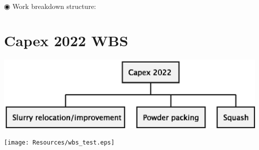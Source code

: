 \documentclass[11pt]{article}
\author{Ricardo Antunes}
\date{\today}
\title{}
\begin{document}
\tableofcontents

◉ Work breakdown structure:
\section{Capex 2022 WBS}
\label{sec:orgb166588}


\label{fig_wbs}
\begin{center}
\includegraphics[width=.9\linewidth]{Resources/wbs.eps}
\end{center}


\begin{center}
\texttt{[image: Resources/wbs\_test.eps]}
\end{center}
\end{document}
